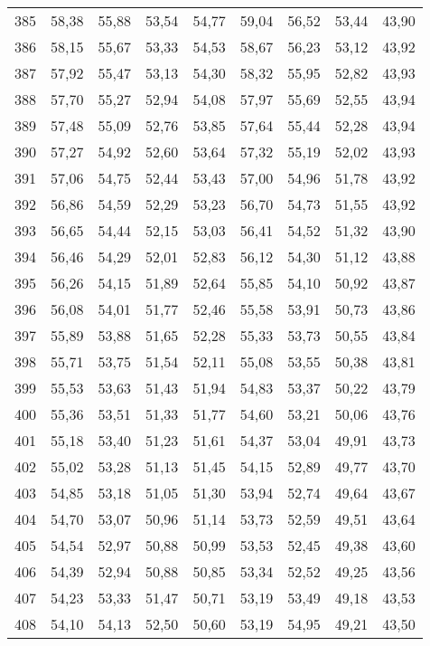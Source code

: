 \begin{longtable}{c c c c c c c c c}
385	& 58,38	& 55,88	& 53,54	& 54,77	& 59,04	& 56,52	& 53,44	& 43,90 \\
386	& 58,15	& 55,67	& 53,33	& 54,53	& 58,67	& 56,23	& 53,12	& 43,92 \\
387	& 57,92	& 55,47	& 53,13	& 54,30	& 58,32	& 55,95	& 52,82	& 43,93 \\
388	& 57,70	& 55,27	& 52,94	& 54,08	& 57,97	& 55,69	& 52,55	& 43,94 \\
389	& 57,48	& 55,09	& 52,76	& 53,85	& 57,64	& 55,44	& 52,28	& 43,94 \\
390	& 57,27	& 54,92	& 52,60	& 53,64	& 57,32	& 55,19	& 52,02	& 43,93 \\
391	& 57,06	& 54,75	& 52,44	& 53,43	& 57,00	& 54,96	& 51,78	& 43,92 \\
392	& 56,86	& 54,59	& 52,29	& 53,23	& 56,70	& 54,73	& 51,55	& 43,92 \\
393	& 56,65	& 54,44	& 52,15	& 53,03	& 56,41	& 54,52	& 51,32	& 43,90 \\
394	& 56,46	& 54,29	& 52,01	& 52,83	& 56,12	& 54,30	& 51,12	& 43,88 \\
395	& 56,26	& 54,15	& 51,89	& 52,64	& 55,85	& 54,10	& 50,92	& 43,87 \\
396	& 56,08	& 54,01	& 51,77	& 52,46	& 55,58	& 53,91	& 50,73	& 43,86 \\
397	& 55,89	& 53,88	& 51,65	& 52,28	& 55,33	& 53,73	& 50,55	& 43,84 \\
398	& 55,71	& 53,75	& 51,54	& 52,11	& 55,08	& 53,55	& 50,38	& 43,81 \\
399	& 55,53	& 53,63	& 51,43	& 51,94	& 54,83	& 53,37	& 50,22	& 43,79 \\
400	& 55,36	& 53,51	& 51,33	& 51,77	& 54,60	& 53,21	& 50,06	& 43,76 \\
401	& 55,18	& 53,40	& 51,23	& 51,61	& 54,37	& 53,04	& 49,91	& 43,73 \\
402	& 55,02	& 53,28	& 51,13	& 51,45	& 54,15	& 52,89	& 49,77	& 43,70 \\
403	& 54,85	& 53,18	& 51,05	& 51,30	& 53,94	& 52,74	& 49,64	& 43,67 \\
404	& 54,70	& 53,07	& 50,96	& 51,14	& 53,73	& 52,59	& 49,51	& 43,64 \\
405	& 54,54	& 52,97	& 50,88	& 50,99	& 53,53	& 52,45	& 49,38	& 43,60 \\
406	& 54,39	& 52,94	& 50,88	& 50,85	& 53,34	& 52,52	& 49,25	& 43,56 \\
407	& 54,23	& 53,33	& 51,47	& 50,71	& 53,19	& 53,49	& 49,18	& 43,53 \\
408	& 54,10	& 54,13	& 52,50	& 50,60	& 53,19	& 54,95	& 49,21	& 43,50 \\

\end{longtable}
